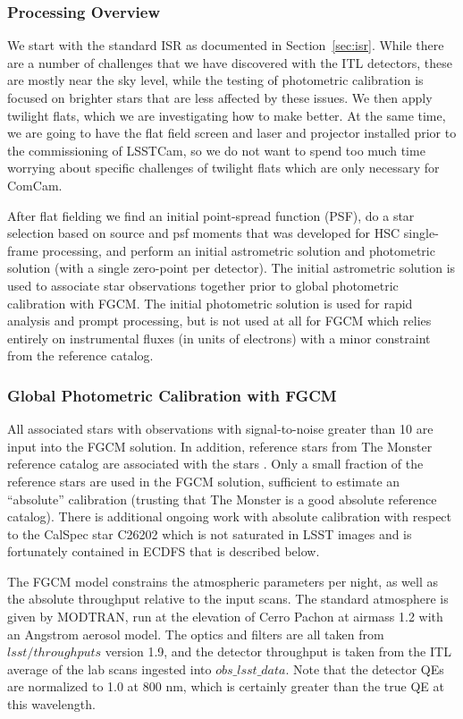 \subsubsection{Processing Overview}

We start with the standard ISR as documented in Section~\ref{sec:isr}. While
there are a number of challenges that we have discovered with the ITL
detectors, these are mostly near the sky level, while the testing of
photometric calibration is focused on brighter stars that are less affected by
these issues. We then apply twilight flats, which we are investigating how to
make better. At the same time, we are going to have the flat field screen and
laser and projector installed prior to the commissioning of LSSTCam, so we do
not want to spend too much time worrying about specific challenges of twilight
flats which are only necessary for ComCam.

After flat fielding we find an initial point-spread function (PSF), do a star
selection based on source and psf moments that was developed for HSC
single-frame processing, and perform an initial astrometric solution and
photometric solution (with a single zero-point per detector).  The initial
astrometric solution is used to associate star observations together prior to
global photometric calibration with FGCM.  The initial photometric solution is
used for rapid analysis and prompt processing, but is not used at all for FGCM
which relies entirely on instrumental fluxes (in units of electrons) with a
minor constraint from the reference catalog.

\subsubsection{Global Photometric Calibration with FGCM}

All associated stars with observations with signal-to-noise greater than 10 are
input into the FGCM solution.  In addition, reference stars from The Monster
reference catalog are associated with the stars .  Only a small fraction of the
reference stars are used in the FGCM solution, sufficient to estimate an
``absolute'' calibration (trusting that The Monster is a good absolute
reference catalog).  There is additional ongoing work with absolute calibration
with respect to the CalSpec star C26202 which is not saturated in LSST images
and is fortunately contained in ECDFS that is described below.

The FGCM model constrains the atmospheric parameters per night, as well as the
absolute throughput relative to the input scans.  The standard atmosphere is
given by MODTRAN, run at the elevation of Cerro Pachon at airmass 1.2 with an
Angstrom aerosol model.  The optics and filters are all taken from
$lsst/throughputs$ version 1.9, and the detector throughput is taken from the
ITL average of the lab scans ingested into $obs\_lsst\_data$.  Note that the
detector QEs are normalized to 1.0 at 800 nm, which is certainly
greater than the true QE at this wavelength.

